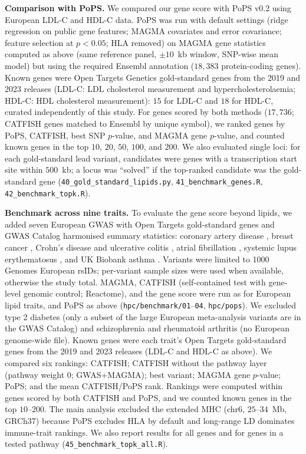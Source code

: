 \textbf{Comparison with PoPS.} We compared our gene score with PoPS v0.2 \citep{Weeks2023PoPS} using European LDL-C and HDL-C data. PoPS was run with default settings (ridge regression on public gene features; MAGMA covariates and error covariance; feature selection at $p<0.05$; HLA removed) on MAGMA gene statistics computed as above (same reference panel, $\pm10$~kb window, SNP-wise mean model) but using the required Ensembl annotation ($18{,}383$ protein-coding genes). Known genes were Open Targets Genetics gold-standard genes \citep{Mountjoy2021L2G} from the 2019 and 2023 releases (LDL-C: LDL cholesterol measurement and hypercholesterolaemia; HDL-C: HDL cholesterol measurement): $15$ for LDL-C and $18$ for HDL-C, curated independently of this study. For genes scored by both methods ($17{,}736$; CATFISH genes matched to Ensembl by unique symbol), we ranked genes by PoPS, CATFISH, best SNP $p$-value, and MAGMA gene $p$-value, and counted known genes in the top $10$, $20$, $50$, $100$, and $200$. We also evaluated single loci: for each gold-standard lead variant, candidates were genes with a transcription start site within $500$~kb; a locus was “solved” if the top-ranked candidate was the gold-standard gene (\texttt{40\_gold\_standard\_lipids.py}, \texttt{41\_benchmark\_genes.R}, \texttt{42\_benchmark\_topk.R}).

\textbf{Benchmark across nine traits.} To evaluate the gene score beyond lipids, we added seven European GWAS with Open Targets gold-standard genes \citep{Mountjoy2021L2G} and GWAS Catalog harmonised summary statistics: coronary artery disease \citep{vanderHarst2018CAD}, breast cancer \citep{Michailidou2017BRCA}, Crohn's disease and ulcerative colitis \citep{deLange2017IBD}, atrial fibrillation \citep{Nielsen2018AF}, systemic lupus erythematosus \citep{Bentham2015SLE}, and UK Biobank asthma \citep{Valette2021Asthma}. Variants were limited to 1000 Genomes European rsIDs; per-variant sample sizes were used when available, otherwise the study total. MAGMA, CATFISH (self-contained test with gene-level genomic control; Reactome), and the gene score were run as for European lipid traits, and PoPS as above (\texttt{hpc/benchmark/01}--\texttt{04}, \texttt{hpc/pops}). We excluded type 2 diabetes (only a subset of the large European meta-analysis variants are in the GWAS Catalog) and schizophrenia and rheumatoid arthritis (no European genome-wide file). Known genes were each trait’s Open Targets gold-standard genes from the 2019 and 2023 releases (LDL-C and HDL-C as above). We compared six rankings: CATFISH; CATFISH without the pathway layer (pathway weight $0$; GWAS+MAGMA); best variant; MAGMA gene $p$-value; PoPS; and the mean CATFISH/PoPS rank. Rankings were computed within genes scored by both CATFISH and PoPS, and we counted known genes in the top $10$--$200$. The main analysis excluded the extended MHC (chr6, $25$--$34$~Mb, GRCh37) because PoPS excludes HLA by default and long-range LD dominates immune-trait rankings. We also report results for all genes and for genes in a tested pathway (\texttt{45\_benchmark\_topk\_all.R}).

